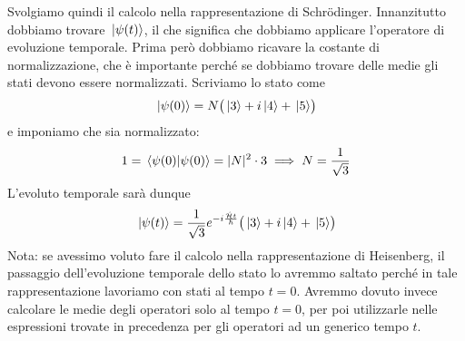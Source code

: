 \begin{soluzione}
   Svolgiamo quindi il calcolo nella rappresentazione di Schrödinger. Innanzitutto dobbiamo trovare $\ket*{\psi(t)}$, il che significa che dobbiamo applicare l'operatore di evoluzione temporale. Prima però dobbiamo ricavare la costante di normalizzazione, che è importante perché se dobbiamo trovare delle medie gli stati devono essere normalizzati. Scriviamo lo stato come
   \begin{equation*}
      \ket*{\psi(0)}=N \bigl( \ket*{3} + i\ket*{4} + \ket*{5} \bigr)
   \end{equation*}
   e imponiamo che sia normalizzato:
   \begin{equation*}
      1
      =\braket*{\psi(0)}
      =|N|^2 \cdot 3
      \implies
      N=\frac{1}{\sqrt{3}}
   \end{equation*}
   L'evoluto temporale sarà dunque
   \begin{equation*}
      \ket*{\psi(t)}=\frac{1}{\sqrt{3}} e^{-i\frac{\hat{\mathcal{H}} t}{\hbar}} \bigl( \ket*{3} + i\ket*{4} + \ket*{5} \bigr)
   \end{equation*}
   Nota: se avessimo voluto fare il calcolo nella rappresentazione di Heisenberg, il passaggio dell'evoluzione temporale dello stato lo avremmo saltato perché in tale rappresentazione lavoriamo con stati al tempo $t=0$. Avremmo dovuto invece calcolare le medie degli operatori solo al tempo $t=0$, per poi utilizzarle nelle espressioni trovate in precedenza per gli operatori ad un generico tempo $t$.
   

\end{soluzione}
